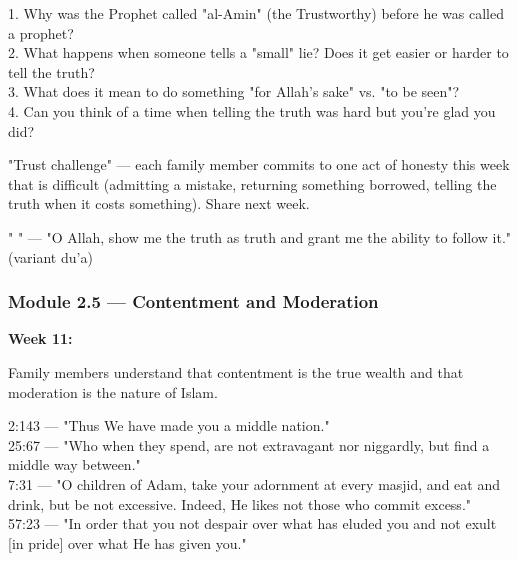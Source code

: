 \documentclass[11pt,a4paper]{article}
\begin{document}
\begin{discussionbox} 1. Why was the Prophet called "al-Amin" (the Trustworthy) before he was called a prophet? \\ 2. What happens when someone tells a "small" lie? Does it get easier or harder to tell the truth? \\ 3. What does it mean to do something "for Allah's sake" vs. "to be seen"? \\ 4. Can you think of a time when telling the truth was hard but you're glad you did? \end{discussionbox}

\begin{activitybox} "Trust challenge" --- each family member commits to one act of honesty this week that is difficult (admitting a mistake, returning something borrowed, telling the truth when it costs something). Share next week. \end{activitybox}

\begin{duabox} "     " --- "O Allah, show me the truth as truth and grant me the ability to follow it." (variant du'a) \end{duabox}

\vspace{6pt}\noindent{\color{border}\rule{\textwidth}{0.5pt}}\vspace{6pt}

\subsubsection*{Module 2.5 --- Contentment and Moderation}
\textbf{Week 11:} 

\begin{outcomebox} Family members understand that contentment is the true wealth and that moderation is the nature of Islam. \end{outcomebox}

\begin{quranbox} 2:143 --- "Thus We have made you a middle nation." \\ 25:67 --- "Who when they spend, are not extravagant nor niggardly, but find a middle way between." \\ 7:31 --- "O children of Adam, take your adornment at every masjid, and eat and drink, but be not excessive. Indeed, He likes not those who commit excess." \\ 57:23 --- "In order that you not despair over what has eluded you and not exult [in pride] over what He has given you." \end{quranbox}
\end{document}
